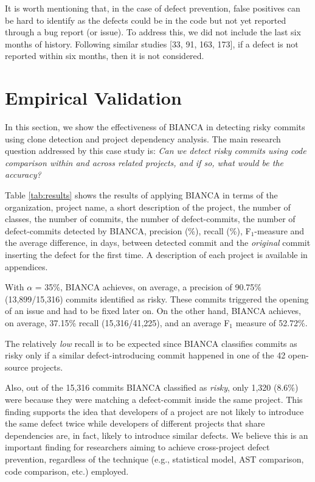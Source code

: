\documentclass[12pt]{report}
\begin{document}
It is worth mentioning that, in the case of defect prevention, false
positives can be hard to identify as the defects could be in the code
but not yet reported through a bug report (or issue). To address this,
we did not include the last six months of history. Following similar
studies {[}33, 91, 163, 173{]}, if a defect is not reported within six
months, then it is not considered.

\section{Empirical Validation}\label{empirical-validation-2}

In this section, we show the effectiveness of BIANCA in detecting risky
commits using clone detection and project dependency analysis. The main
research question addressed by this case study is: \emph{Can we detect
risky commits using code comparison within and across related projects,
and if so, what would be the accuracy?}

Table \ref{tab:results} shows the results of applying BIANCA in terms of
the organization, project name, a short description of the project, the
number of classes, the number of commits, the number of defect-commits,
the number of defect-commits detected by BIANCA, precision (\%), recall
(\%), F\(_1\)-measure and the average difference, in days, between
detected commit and the \emph{original} commit inserting the defect for
the first time. A description of each project is available in
appendices.

With \(\alpha\) = 35\%, BIANCA achieves, on average, a precision of
90.75\% (13,899/15,316) commits identified as risky. These commits
triggered the opening of an issue and had to be fixed later on. On the
other hand, BIANCA achieves, on average, 37.15\% recall (15,316/41,225),
and an average F\(_1\) measure of 52.72\%.



The relatively \emph{low} recall is to be expected since BIANCA
classifies commits as risky only if a similar defect-introducing commit
happened in one of the 42 open-source projects.

Also, out of the 15,316 commits BIANCA classified as \emph{risky}, only
1,320 (8.6\%) were because they were matching a defect-commit inside the
same project. This finding supports the idea that developers of a
project are not likely to introduce the same defect twice while
developers of different projects that share dependencies are, in fact,
likely to introduce similar defects. We believe this is an important
finding for researchers aiming to achieve cross-project defect
prevention, regardless of the technique (e.g., statistical model, AST
comparison, code comparison, etc.) employed.
\end{document}

